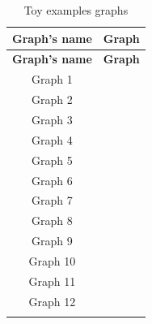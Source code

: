 \begin{longtable}{|c|c|}
\hline
\textbf{Graph's name} & \textbf{Graph} \\
\hline
\endfirsthead

\hline
\textbf{Graph's name} & \textbf{Graph} \\
\hline
\endhead

\hline
\endfoot

\hline
\endlastfoot

Graph 1 &  \\
\hline
Graph 2 &  \\
\hline
Graph 3 &  \\
\hline
Graph 4 &  \\
\hline
Graph 5 &  \\
\hline
Graph 6 &  \\
\hline
Graph 7 &  \\
\hline
Graph 8 &  \\
\hline
Graph 9 &  \\
\hline
Graph 10 &  \\
\hline
Graph 11 &  \\
\hline
Graph 12 &  \\
\hline
\captionsetup{justification=centering} %
\caption{Toy examples graphs}
\label{tab:graphs}

\end{longtable}